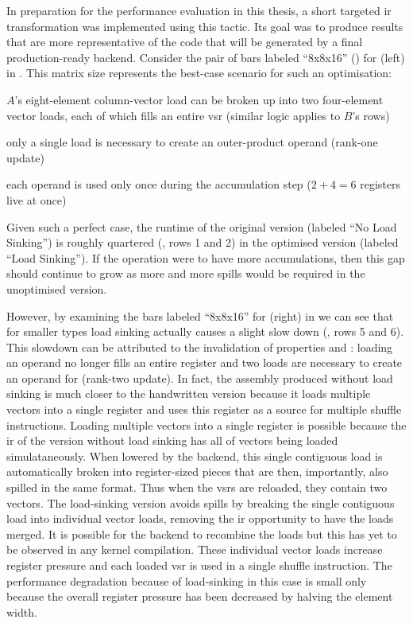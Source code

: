 \documentclass[\main/thesis.tex]{subfiles}
\begin{document}
In preparation for the performance evaluation in this thesis, a short targeted \gls{ir} transformation was implemented using this tactic.
Its goal was to produce results that are more representative of the code that will be generated by a final production-ready backend.
Consider the pair of bars labeled ``8x8x16'' () for  (left) in .
This matrix size represents the best-case scenario for such an optimisation:
\begin{enumerate*}[itemjoin={{; }}, itemjoin*={{; and }}, label={\protect\circled{\arabic*}}, after={.}]
  \item $A$'s eight-element column-vector load can be broken up into two four-element vector loads, each of which fills an entire \gls{vsr} (similar logic applies to $B$'s rows)
  \item only a single load is necessary to create an outer-product operand (rank-one update)
  \item each operand is used only once during the accumulation step ($2+4=6$ registers \gls{live} at once)
\end{enumerate*}
Given such a perfect case, the runtime of the original version (labeled ``No Load Sinking'') is roughly quartered (, rows 1 and 2) in the optimised version (labeled ``Load Sinking'').
If the operation were to have more accumulations, then this gap should continue to grow as more and more spills would be required in the unoptimised version.

However, by examining the bars labeled ``8x8x16'' for  (right) in  we can see that for smaller types load sinking actually causes a slight slow down (, rows 5 and 6).
This slowdown can be attributed to the invalidation of properties  and : loading an  operand no longer fills an entire register and two loads are necessary to create an operand for  (rank-two update).
In fact, the assembly produced without load sinking is much closer to the handwritten version because it loads multiple vectors into a single register and uses this register as a source for multiple shuffle instructions.
Loading multiple vectors into a single register is possible because the \gls{ir} of the version without load sinking has all of vectors being loaded simulataneously.
When lowered by the backend, this single contiguous load is automatically broken into register-sized pieces that are then, importantly, also spilled in the same format.
Thus when the \glspl{vsr} are reloaded, they contain two  vectors.
The load-sinking version avoids spills by breaking the single contiguous load into individual vector loads, removing the \gls{ir} opportunity to have the loads merged.
It is possible for the backend to recombine the loads but this has yet to be observed in any kernel compilation.
These individual vector loads increase register pressure and each loaded \gls{vsr} is used in a single shuffle instruction.
The performance degradation because of load-sinking in this case is small only because the overall register pressure has been decreased by halving the element width.
\end{document}
